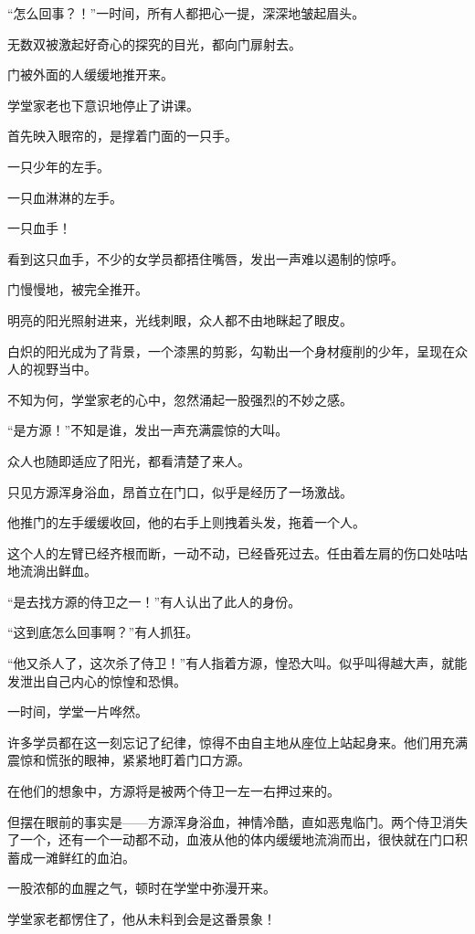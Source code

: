 \begin{this_body}
“怎么回事？！”一时间，所有人都把心一提，深深地皱起眉头。

无数双被激起好奇心的探究的目光，都向门扉射去。

门被外面的人缓缓地推开来。

学堂家老也下意识地停止了讲课。

首先映入眼帘的，是撑着门面的一只手。

一只少年的左手。

一只血淋淋的左手。

一只血手！

看到这只血手，不少的女学员都捂住嘴唇，发出一声难以遏制的惊呼。

门慢慢地，被完全推开。

明亮的阳光照射进来，光线刺眼，众人都不由地眯起了眼皮。

白炽的阳光成为了背景，一个漆黑的剪影，勾勒出一个身材瘦削的少年，呈现在众人的视野当中。

不知为何，学堂家老的心中，忽然涌起一股强烈的不妙之感。

“是方源！”不知是谁，发出一声充满震惊的大叫。

众人也随即适应了阳光，都看清楚了来人。

只见方源浑身浴血，昂首立在门口，似乎是经历了一场激战。

他推门的左手缓缓收回，他的右手上则拽着头发，拖着一个人。

这个人的左臂已经齐根而断，一动不动，已经昏死过去。任由着左肩的伤口处咕咕地流淌出鲜血。

“是去找方源的侍卫之一！”有人认出了此人的身份。

“这到底怎么回事啊？”有人抓狂。

“他又杀人了，这次杀了侍卫！”有人指着方源，惶恐大叫。似乎叫得越大声，就能发泄出自己内心的惊惶和恐惧。

一时间，学堂一片哗然。

许多学员都在这一刻忘记了纪律，惊得不由自主地从座位上站起身来。他们用充满震惊和慌张的眼神，紧紧地盯着门口方源。

在他们的想象中，方源将是被两个侍卫一左一右押过来的。

但摆在眼前的事实是——方源浑身浴血，神情冷酷，直如恶鬼临门。两个侍卫消失了一个，还有一个一动都不动，血液从他的体内缓缓地流淌而出，很快就在门口积蓄成一滩鲜红的血泊。

一股浓郁的血腥之气，顿时在学堂中弥漫开来。

学堂家老都愣住了，他从未料到会是这番景象！


\end{this_body}
